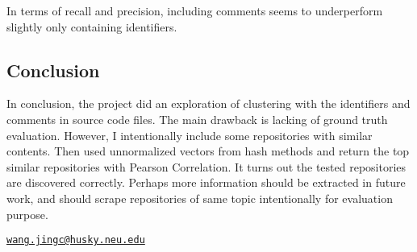 In terms of recall and precision, including comments seems to
underperform slightly only containing identifiers.

\hypertarget{conclusion}{%
\subsection{Conclusion}\label{conclusion}}

In conclusion, the project did an exploration of clustering with the
identifiers and comments in source code files. The main drawback is
lacking of ground truth evaluation. However, I intentionally include
some repositories with similar contents. Then used unnormalized vectors
from hash methods and return the top similar repositories with Pearson
Correlation. It turns out the tested repositories are discovered
correctly. Perhaps more information should be extracted in future work,
and should scrape repositories of same topic intentionally for
evaluation purpose.




\address{%
Jingci Wang\\
Northeastern University\\
Khoury College of Computer Sciences\\ Data Science\\
}
\href{mailto:wang.jingc@husky.neu.edu}{\nolinkurl{wang.jingc@husky.neu.edu}}

